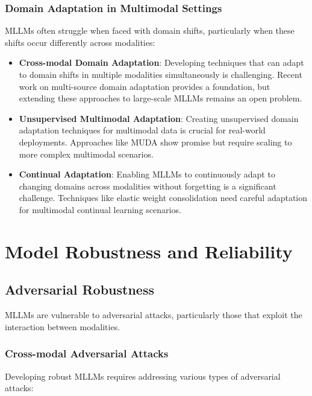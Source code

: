 \subsubsection{Domain Adaptation in Multimodal Settings}
MLLMs often struggle when faced with domain shifts, particularly when these shifts occur differently across modalities:

\begin{itemize}
    \item \textbf{Cross-modal Domain Adaptation}: Developing techniques that can adapt to domain shifts in multiple modalities simultaneously is challenging. Recent work on multi-source domain adaptation \citep{peng2019moment} provides a foundation, but extending these approaches to large-scale MLLMs remains an open problem.
    
    \item \textbf{Unsupervised Multimodal Adaptation}: Creating unsupervised domain adaptation techniques for multimodal data is crucial for real-world deployments. Approaches like MUDA \citep{yang2020muda} show promise but require scaling to more complex multimodal scenarios.
    
    \item \textbf{Continual Adaptation}: Enabling MLLMs to continuously adapt to changing domains across modalities without forgetting is a significant challenge. Techniques like elastic weight consolidation \citep{kirkpatrick2017overcoming} need careful adaptation for multimodal continual learning scenarios.
\end{itemize}

\section{Model Robustness and Reliability}

\subsection{Adversarial Robustness}
MLLMs are vulnerable to adversarial attacks, particularly those that exploit the interaction between modalities.

\subsubsection{Cross-modal Adversarial Attacks}
Developing robust MLLMs requires addressing various types of adversarial attacks:

